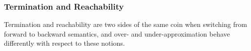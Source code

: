 \subsubsection*{Termination and Reachability}
%

Termination and reachability are two sides of the same coin when switching from forward to backward semantics, and over- and under-approximation behave differently with respect to these notions.


